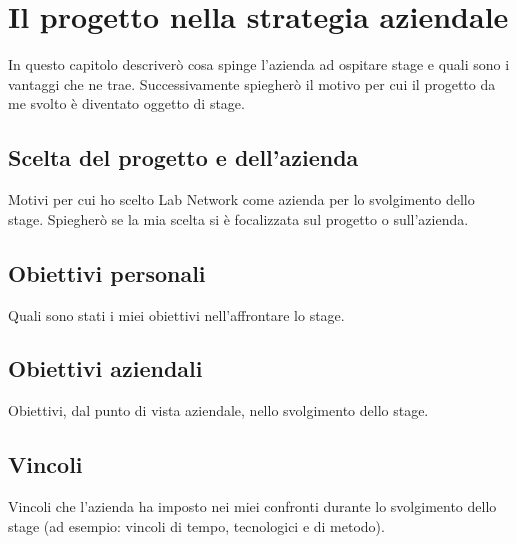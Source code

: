 
\chapter{Il progetto nella strategia aziendale}
\label{cap:processi-metodologie}

In questo capitolo descriverò cosa spinge l'azienda ad ospitare stage e quali sono i vantaggi che ne trae.
Successivamente spiegherò il motivo per cui il progetto da me svolto è diventato oggetto di stage.
\section{Scelta del progetto e dell'azienda}
Motivi per cui ho scelto Lab Network come azienda per lo svolgimento dello stage.
Spiegherò se la mia scelta si è focalizzata sul progetto o sull'azienda.

\section{Obiettivi personali}
Quali sono stati i miei obiettivi nell'affrontare lo stage.

\section{Obiettivi aziendali}
Obiettivi, dal punto di vista aziendale, nello svolgimento dello stage.

\section{Vincoli}
Vincoli che l'azienda ha imposto nei miei confronti durante lo svolgimento dello stage (ad esempio: vincoli di tempo, tecnologici e di metodo).